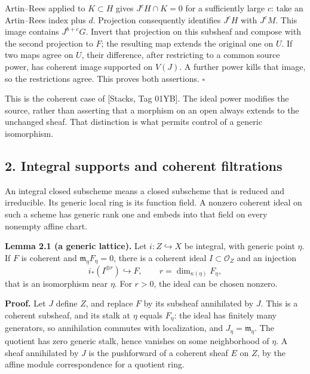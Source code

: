 \documentclass[11pt]{article}
\begin{document}
Artin--Rees applied to \(K\subset H\) gives \(J^cH\cap K=0\) for a
sufficiently large \(c\): take an Artin--Rees index plus \(d\).
Projection consequently identifies \(J^cH\) with \(J^cM\). This image
contains \(J^{b+c}G\). Invert that projection on this subsheaf and
compose with the second projection to \(F\); the resulting map extends
the original one on \(U\). If two maps agree on \(U\), their difference,
after restricting to a common source power, has coherent image supported
on \(V(J)\). A further power kills that image, so the restrictions
agree. This proves both assertions. \(\square\)

This is the coherent case of {[}Stacks, Tag 01YB{]}. The ideal power
modifies the source, rather than asserting that a morphism on an open
always extends to the unchanged sheaf. That distinction is what permits
control of a generic isomorphism.

\subsection{2. Integral supports and coherent
filtrations}\label{integral-supports-and-coherent-filtrations}

An integral closed subscheme means a closed subscheme that is reduced
and irreducible. Its generic local ring is its function field. A nonzero
coherent ideal on such a scheme has generic rank one and embeds into
that field on every nonempty affine chart.

\textbf{Lemma 2.1 (a generic lattice).} Let \(i:Z\hookrightarrow X\) be
integral, with generic point \(\eta\). If \(F\) is coherent and
\(\mathfrak m_\eta F_\eta=0\), there is a coherent ideal
\(I\subset\mathcal O_Z\) and an injection \[
i_*(I^{\oplus r})\hookrightarrow F,
\qquad r=\dim_{\kappa(\eta)}F_\eta,
\] that is an isomorphism near \(\eta\). For \(r>0\), the ideal can be
chosen nonzero.

\textbf{Proof.} Let \(J\) define \(Z\), and replace \(F\) by its
subsheaf annihilated by \(J\). This is a coherent subsheaf, and its
stalk at \(\eta\) equals \(F_\eta\): the ideal has finitely many
generators, so annihilation commutes with localization, and
\(J_\eta=\mathfrak m_\eta\). The quotient has zero generic stalk, hence
vanishes on some neighborhood of \(\eta\). A sheaf annihilated by \(J\)
is the pushforward of a coherent sheaf \(E\) on \(Z\), by the affine
module correspondence for a quotient ring.
\end{document}
